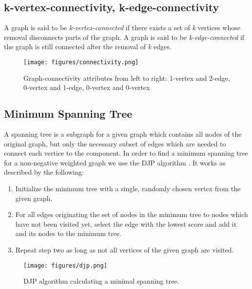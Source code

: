   \subsection{k-vertex-connectivity, k-edge-connectivity}
    A graph is said to be \textit{k-vertex-connected} if there exists a set of \textit{k} vertices whose removal disconnects parts of the graph.\newline
    A graph is said to be \textit{k-edge-connected} if the graph is still connected after the removal of \textit{k} edges.
    \begin{figure}[th!]
      \centering
      \texttt{[image: figures/connectivity.png]}
      \caption{Graph-connectivity attributes from left to right: 1-vertex and 2-edge, 0-vertex and 1-edge, 0-vertex and 0-vertex}
      \label{fig:connectivity}
    \end{figure}
    
  \subsection{Minimum Spanning Tree}
    A spanning tree is a subgraph for a given graph which contains all nodes of the original graph, but only the necessary subset of edges which are needed to connect each vertice
    to the component. In order to find a minimum spanning tree for a non-negative weighted graph we use the DJP algorithm \cite{prim}\cite{jarnik}.
    It works as described by the following:
    
    \begin{enumerate}
     \item Initialize the minimum tree with a single, randomly chosen vertex from the given graph.
     
     \item For all edges originating the set of nodes in the minimum tree to nodes which have not been visited yet, select the edge with the lowest score and add it and its nodes 
      to the minimum tree.
      
     \item Repeat step two as long as not all vertices of the given graph are visited.
    \end{enumerate}
    
    \begin{figure}[th!]
      \centering
      \texttt{[image: figures/djp.png]}
      \caption{DJP algorithm calculating a minimal spanning tree.}
      \label{fig:djp}
    \end{figure}
    

